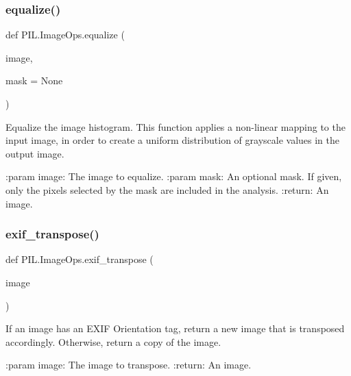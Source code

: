\subsubsection{\texorpdfstring{equalize()}{equalize()}}
{\footnotesize\ttfamily def P\+I\+L.\+Image\+Ops.\+equalize (\begin{DoxyParamCaption}\item[{}]{image,  }\item[{}]{mask = {\ttfamily None} }\end{DoxyParamCaption})}

\begin{DoxyVerb}Equalize the image histogram. This function applies a non-linear
mapping to the input image, in order to create a uniform
distribution of grayscale values in the output image.

:param image: The image to equalize.
:param mask: An optional mask.  If given, only the pixels selected by
             the mask are included in the analysis.
:return: An image.
\end{DoxyVerb}
 \mbox{\label{namespacePIL_1_1ImageOps_ad992424186ace22f9fc9e85f20f1fbe3}} 
\subsubsection{\texorpdfstring{exif\+\_\+transpose()}{exif\_transpose()}}
{\footnotesize\ttfamily def P\+I\+L.\+Image\+Ops.\+exif\+\_\+transpose (\begin{DoxyParamCaption}\item[{}]{image }\end{DoxyParamCaption})}

\begin{DoxyVerb}If an image has an EXIF Orientation tag, return a new image that is
transposed accordingly. Otherwise, return a copy of the image.

:param image: The image to transpose.
:return: An image.
\end{DoxyVerb}
 \mbox{\label{namespacePIL_1_1ImageOps_a2d9d10f23a0b211caa54efef496aa3eb}} 
